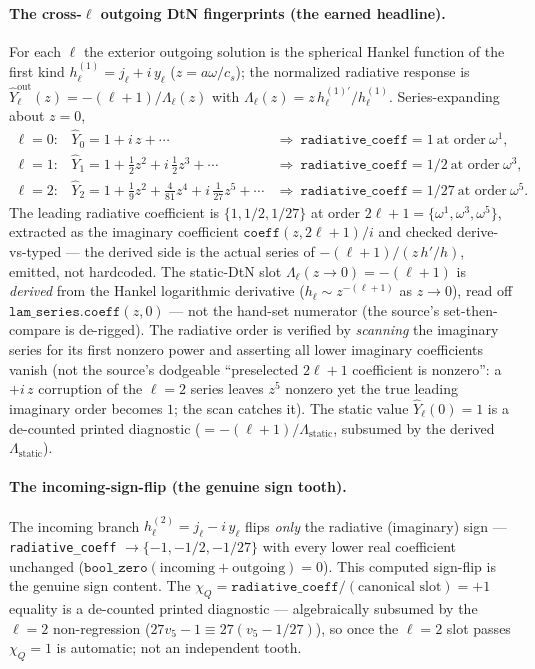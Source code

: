 \paragraph{The cross-\texorpdfstring{\(\ell\)}{l} outgoing DtN fingerprints (the earned headline).}
For each \(\ell\) the exterior outgoing solution is the spherical Hankel function of the first kind \(h_\ell^{(1)}=j_\ell+i\,y_\ell\)
(\(z=a\omega/c_s\)); the normalized radiative response is \(\hat Y_\ell^{\mathrm{out}}(z)=-(\ell+1)/\Lambda_\ell(z)\) with
\(\Lambda_\ell(z)=z\,h_\ell^{(1)\prime}/h_\ell^{(1)}\). Series-expanding about \(z=0\),
\[
\begin{array}{lll}
\ell=0: & \hat Y_0 = 1 + i\,z + \cdots & \Rightarrow\ \texttt{radiative\_coeff}=1\ \text{at order}\ \omega^1,\\
\ell=1: & \hat Y_1 = 1 + \tfrac12 z^2 + i\,\tfrac12 z^3 + \cdots & \Rightarrow\ \texttt{radiative\_coeff}=1/2\ \text{at order}\ \omega^3,\\
\ell=2: & \hat Y_2 = 1 + \tfrac19 z^2 + \tfrac{4}{81} z^4 + i\,\tfrac{1}{27} z^5 + \cdots & \Rightarrow\ \texttt{radiative\_coeff}=1/27\ \text{at order}\ \omega^5.
\end{array}
\]
The leading radiative coefficient is \(\{1,1/2,1/27\}\) at order \(2\ell+1=\{\omega^1,\omega^3,\omega^5\}\), extracted as the
imaginary coefficient \(\texttt{coeff}(z,2\ell+1)/i\) and checked derive-vs-typed --- the derived side is the actual series of
\(-(\ell+1)/(z\,h'/h)\), emitted, not hardcoded. The static-DtN slot \(\Lambda_\ell(z\to0)=-(\ell+1)\) is \emph{derived} from
the Hankel logarithmic derivative (\(h_\ell\sim z^{-(\ell+1)}\) as \(z\to0\)), read off \(\texttt{lam\_series.coeff}(z,0)\) ---
not the hand-set numerator (the source's set-then-compare is de-rigged). The radiative order is verified by \emph{scanning}
the imaginary series for its first nonzero power and asserting all lower imaginary coefficients vanish (not the source's
dodgeable ``preselected \(2\ell+1\) coefficient is nonzero'': a \(+i\,z\) corruption of the \(\ell=2\) series leaves \(z^5\)
nonzero yet the true leading imaginary order becomes \(1\); the scan catches it). The static value \(\hat Y_\ell(0)=1\) is a
de-counted printed diagnostic (\(=-(\ell+1)/\Lambda_{\mathrm{static}}\), subsumed by the derived \(\Lambda_{\mathrm{static}}\)).

\paragraph{The incoming-sign-flip (the genuine sign tooth).}
The incoming branch \(h_\ell^{(2)}=j_\ell-i\,y_\ell\) flips \emph{only} the radiative (imaginary) sign --- \texttt{radiative\_coeff}
\(\to\{-1,-1/2,-1/27\}\) with every lower real coefficient unchanged (\(\texttt{bool\_zero}(\mathrm{incoming}+\mathrm{outgoing})=0\)).
This computed sign-flip is the genuine sign content. The \(\chi_Q=\texttt{radiative\_coeff}/(\text{canonical slot})=+1\)
equality is a de-counted printed diagnostic --- algebraically subsumed by the \(\ell=2\) non-regression
(\(27v_5-1\equiv27(v_5-1/27)\)), so once the \(\ell=2\) slot passes \(\chi_Q=1\) is automatic; not an independent tooth.

